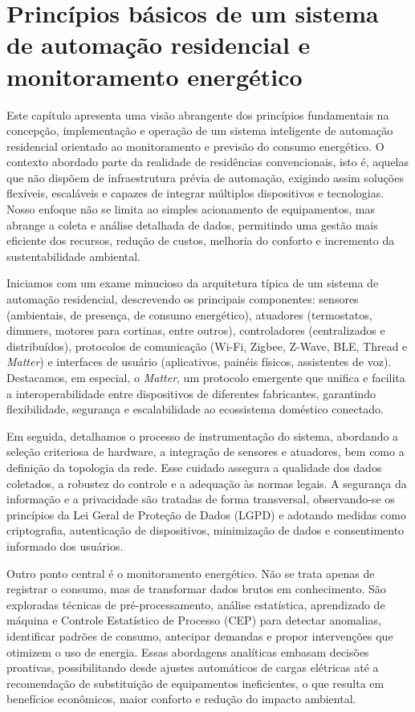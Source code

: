 \chapter[Princípios de Automação Residencial]{Princípios básicos de um sistema
de automação residencial e monitoramento energético}
\label{chap:principios}

Este capítulo apresenta uma visão abrangente dos princípios fundamentais na concepção, implementação e operação de um sistema inteligente de automação residencial orientado ao monitoramento e previsão do consumo energético. O contexto abordado parte da realidade de residências convencionais, isto é, aquelas que não dispõem de infraestrutura prévia de automação, exigindo assim soluções flexíveis, escaláveis e capazes de integrar múltiplos dispositivos e tecnologias. Nosso enfoque não se limita ao simples acionamento de equipamentos, mas abrange a coleta e análise detalhada de dados, permitindo uma gestão mais eficiente dos recursos, redução de custos, melhoria do conforto e incremento da sustentabilidade ambiental.

Iniciamos com um exame minucioso da arquitetura típica de um sistema de automação residencial, descrevendo os principais componentes: sensores (ambientais, de presença, de consumo energético), atuadores (termostatos, dimmers, motores para cortinas, entre outros), controladores (centralizados e distribuídos), protocolos de comunicação (Wi-Fi, Zigbee, Z-Wave, BLE, Thread e \textit{Matter}) e interfaces de usuário (aplicativos, painéis físicos, assistentes de voz). Destacamos, em especial, o \textit{Matter}, um protocolo emergente que unifica e facilita a interoperabilidade entre dispositivos de diferentes fabricantes, garantindo flexibilidade, segurança e escalabilidade ao ecossistema doméstico conectado.

Em seguida, detalhamos o processo de instrumentação do sistema, abordando a seleção criteriosa de hardware, a integração de sensores e atuadores, bem como a definição da topologia da rede. Esse cuidado assegura a qualidade dos dados coletados, a robustez do controle e a adequação às normas legais. A segurança da informação e a privacidade são tratadas de forma transversal, observando-se os princípios da Lei Geral de Proteção de Dados (LGPD) e adotando medidas como criptografia, autenticação de dispositivos, minimização de dados e consentimento informado dos usuários.

Outro ponto central é o monitoramento energético. Não se trata apenas de registrar o consumo, mas de transformar dados brutos em conhecimento. São exploradas técnicas de pré-processamento, análise estatística, aprendizado de máquina e Controle Estatístico de Processo (CEP) para detectar anomalias, identificar padrões de consumo, antecipar demandas e propor intervenções que otimizem o uso de energia. Essas abordagens analíticas embasam decisões proativas, possibilitando desde ajustes automáticos de cargas elétricas até a recomendação de substituição de equipamentos ineficientes, o que resulta em benefícios econômicos, maior conforto e redução do impacto ambiental.

